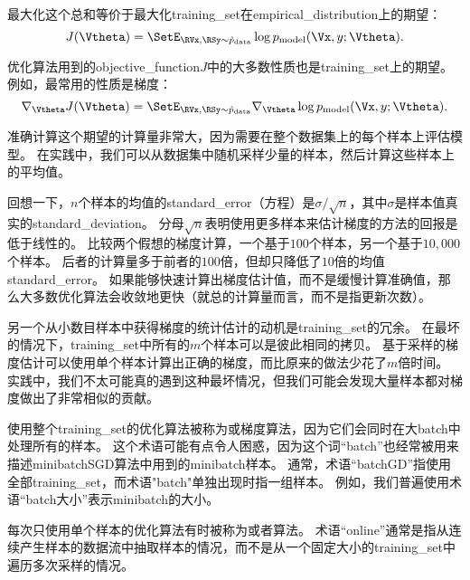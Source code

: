 最大化这个总和等价于最大化\gls{training_set}在\gls{empirical_distribution}上的期望：
\begin{equation}
\label{eq:8.5}
    J(\Vtheta) = \SetE_{\RVx, \RSy \sim\hat{p}_\text{data}} 
    \log p_{\text{model}} (\Vx,y ; \Vtheta) .
\end{equation}


优化算法用到的\gls{objective_function}$J$中的大多数性质也是\gls{training_set}上的期望。
例如，最常用的性质是梯度：
\begin{equation}
\label{eq:8.6}
    \nabla_{\Vtheta} J(\Vtheta) = \SetE_{\RVx, \RSy \sim\hat{p}_{\text{data}}} 
    \nabla_{\Vtheta} \log p_{\text{model}} (\Vx,y; \Vtheta) .
\end{equation}


准确计算这个期望的计算量非常大，因为需要在整个数据集上的每个样本上评估模型。
在实践中，我们可以从数据集中随机采样少量的样本，然后计算这些样本上的平均值。


回想一下，$n$个样本的均值的\gls{standard_error}（方程）是$\sigma/\sqrt{n}$，其中$\sigma$是样本值真实的\gls{standard_deviation}。
分母$\sqrt{n}$表明使用更多样本来估计梯度的方法的回报是低于线性的。
比较两个假想的梯度计算，一个基于$100$个样本，另一个基于$10,000$个样本。
后者的计算量多于前者的$100$倍，但却只降低了$10$倍的均值\gls{standard_error}。
如果能够快速计算出梯度估计值，而不是缓慢计算准确值，那么大多数优化算法会收敛地更快（就总的计算量而言，而不是指更新次数）。


另一个从小数目样本中获得梯度的统计估计的动机是\gls{training_set}的冗余。
在最坏的情况下，\gls{training_set}中所有的$m$个样本可以是彼此相同的拷贝。
基于采样的梯度估计可以使用单个样本计算出正确的梯度，而比原来的做法少花了$m$倍时间。
实践中，我们不太可能真的遇到这种最坏情况，但我们可能会发现大量样本都对梯度做出了非常相似的贡献。

使用整个\gls{training_set}的优化算法被称为或梯度算法，因为它们会同时在大\gls{batch}中处理所有的样本。
这个术语可能有点令人困惑，因为这个词``\gls{batch}''也经常被用来描述\gls{minibatch}\gls{SGD}算法中用到的\gls{minibatch}样本。
通常，术语``\gls{batch}\gls{GD}''指使用全部\gls{training_set}，而术语"\gls{batch}"单独出现时指一组样本。
例如，我们普遍使用术语``\gls{batch}大小''表示\gls{minibatch}的大小。


每次只使用单个样本的优化算法有时被称为或者算法。
术语``\gls{online}''通常是指从连续产生样本的数据流中抽取样本的情况，而不是从一个固定大小的\gls{training_set}中遍历多次采样的情况。


